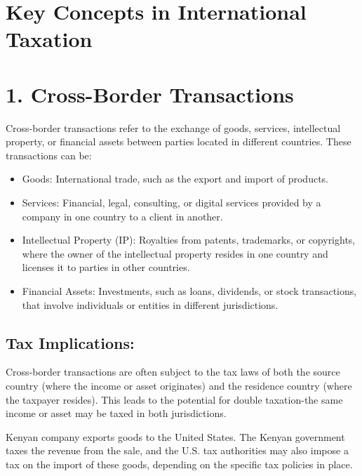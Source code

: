 \documentclass[10pt]{article}
\begin{document}
\section*{Key Concepts in International Taxation}
\section*{1. Cross-Border Transactions}
\begin{definition}
	Cross-border transactions refer to the exchange of goods, services, intellectual property, or financial assets between parties located in different countries. These transactions can be:
\end{definition}


\begin{itemize}
  \item Goods: International trade, such as the export and import of products.
  \item Services: Financial, legal, consulting, or digital services provided by a company in one country to a client in another.
  \item Intellectual Property (IP): Royalties from patents, trademarks, or copyrights, where the owner of the intellectual property resides in one country and licenses it to parties in other countries.
  \item Financial Assets: Investments, such as loans, dividends, or stock transactions, that involve individuals or entities in different jurisdictions.
\end{itemize}

\subsection*{Tax Implications:}
Cross-border transactions are often subject to the tax laws of both the source country (where the income or asset originates) and the residence country (where the taxpayer resides). This leads to the potential for double taxation-the same income or asset may be taxed in both jurisdictions.

\begin{example}
	Kenyan company exports goods to the United States. The Kenyan government taxes the revenue from the sale, and the U.S. tax authorities may also impose a tax on the import of these goods, depending on the specific tax policies in place.
\end{example}
\end{document}
